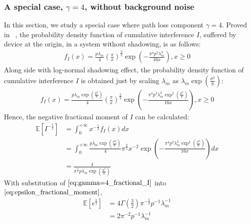 
\subsubsection{A special case, $\gamma=4$, without background noise}
In this section, we study a special case where path loss component $\gamma=4$. Proved in ~\cite[Eq. 3.17]{haenggi2009interference}, the probability density function of cumulative interference $I$, suffered by device at the origin, in a system without shadowing, is as follows:
\begin{align}
f_{I}(x) = \frac{p\lambda_{m}}{4} (\frac{\pi}{x})^{\frac{3}{2}} \exp(-\frac{\pi^4 p^2\lambda_{m}^2}{16x}), x \geq 0
\end{align}
Along side with log-normal shadowing effect, the probability density function of cumulative interference $I$ is obtained just by scaling $\lambda_{m}$ as $ \lambda_{m} \exp(\frac{\sigma^2}{8})$:
\begin{align}
f_{I}(x) = \frac{    p\lambda_{m}   \exp(\frac{\sigma^2}{8})  }{4} (\frac{\pi}{x})^{\frac{3}{2}} \exp(    -\frac{    \pi^4    p^2\lambda_{m}^2     \exp^2(\frac{\sigma^2}{8})    }{    16x    }    ), x \geq 0
\end{align} 
Hence, the negative fractional moment of $I$ can be calculated:
\begin{align}
\label{eq:gamma=4_fractional_I}
\mathbb{E}\left[ I ^{-\frac{1}{2}}\right] &= \int_{0}^{+\infty} x^{-\frac{1}{2}} f_{I}(x) dx \nonumber\\
&= \int_{0}^{+\infty}  \frac{    p\lambda_{m}   \exp(\frac{\sigma^2}{8})  }{4}   \pi^{\frac{3}{2}}  x^{-2}  \exp(    -\frac{    \pi^4    p^2\lambda_{m}^2     \exp^2(\frac{\sigma^2}{8})    }{    16x    }    )  dx \nonumber\\
&= \frac{4}{    \pi^{\frac{5}{2}}  p\lambda_{m} \exp(\frac{\sigma^2}{8}) }
\end{align}
With substitution of $\eqref{eq:gamma=4_fractional_I}$ into $\eqref{eq:epsilon_fractional_moment}$,
\begin{align}
\label{eq:negative_fractonal_epsilon_4}
\mathbb{E}\left[ \epsilon ^{\frac{1}{2}} \right] & = 4\Gamma(\frac{3}{2})\pi^{-\frac{5}{2}} p^{-1}\lambda_{m}^{-1}\nonumber\\
&=2\pi^{-2} p^{-1}\lambda_{m}^{-1}
\end{align}
